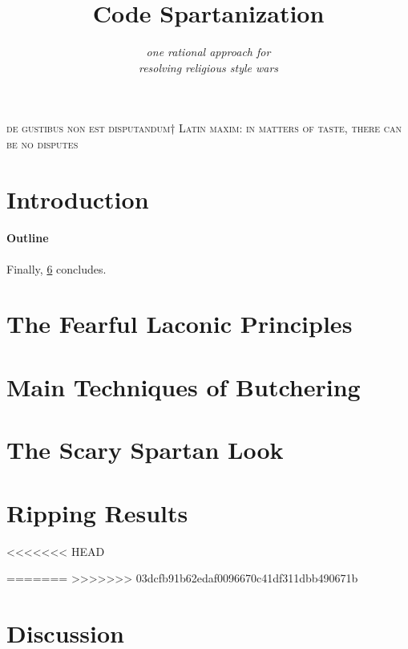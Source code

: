 \documentclass[preprint,10pt,nonatbib]{sigplanconf}
\title{Code Spartanization}
\subtitle{\scriptsize \emph{one rational approach for\\ resolving religious style wars}}
\begin{document}
\textsc{de gustibus non est disputandum†{%
    Latin maxim: in matters of taste, there can be no disputes
}}
{\let\newpage\relax\maketitle}

\begin{abstract}
  
\end{abstract}

\section{Introduction}


\paragraph{Outline}
\label{section:principia}
\label{section:techniques}
\label{section:look}
\label{section:initial}
\label{section:zz}
Finally, \cref{section:zz} concludes.

\section{The Fearful Laconic Principles}
\label{section:principia}


\section{Main Techniques of Butchering}
\label{section:techniques}


\section{The Scary Spartan Look}
\label{section:look}


\section{Ripping Results}
\label{section:initial}


<<<<<<< HEAD
% 

=======
>>>>>>> 03dcfb91b62edaf0096670c41df311dbb490671b
\section{Discussion}
\label{section:zz}

\balance
\small

\end{document}
